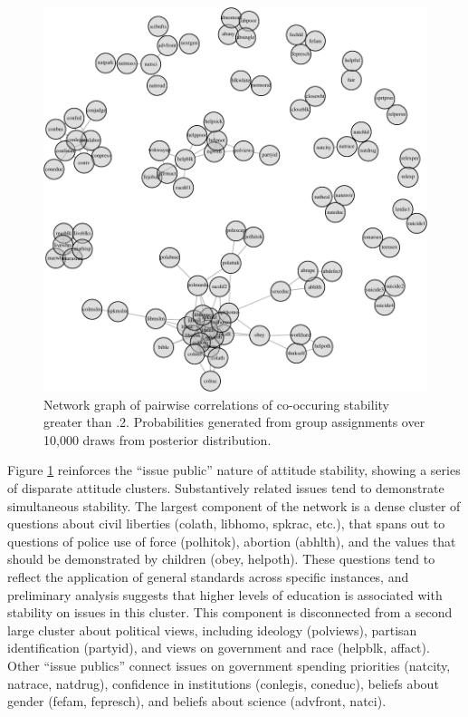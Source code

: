 \documentclass[12pt,]{article}
\begin{document}
\begin{figure}
\centering
\includegraphics{ambivalence_everywhere_files/figure-latex/stabgraph-1.pdf}
\caption{\label{fig:stabgraph}Network graph of pairwise correlations of co-occuring stability greater than .2. Probabilities generated from group assignments over 10,000 draws from posterior distribution.}
\end{figure}

Figure \ref{fig:stabgraph} reinforces the ``issue public'' nature of attitude stability, showing a series of disparate attitude clusters. Substantively related issues tend to demonstrate simultaneous stability. The largest component of the network is a dense cluster of questions about civil liberties (colath, libhomo, spkrac, etc.), that spans out to questions of police use of force (polhitok), abortion (abhlth), and the values that should be demonstrated by children (obey, helpoth). These questions tend to reflect the application of general standards across specific instances, and preliminary analysis suggests that higher levels of education is associated with stability on issues in this cluster. This component is disconnected from a second large cluster about political views, including ideology (polviews), partisan identification (partyid), and views on government and race (helpblk, affact). Other ``issue publics'' connect issues on government spending priorities (natcity, natrace, natdrug), confidence in institutions (conlegis, coneduc), beliefs about gender (fefam, fepresch), and beliefs about science (advfront, natci).
\end{document}
